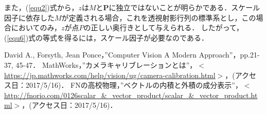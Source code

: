 \documentclass[a4paper,10pt]{jarticle}
\begin{document}
また，(\ref{equ2})式から，$ z $は$ M $と$ {\bm P} $に独立ではないことが明らかである．スケール因子に依存した$ M $が定義される場合，これを透視射影行列の標準系とし，この場合においてのみ，$ z $が点$ P $の正しい奥行きとして与えられる．
したがって，(\ref{equ6})式の等式を得るには，スケール因子が必要なのである．


\begin{thebibliography}{99}
 David A., Forsyth, Jean Ponce，”Computer Vision A Modern Approach”，pp.21-37, 45-47．
 MathWorks，”カメラキャリブレーションとは”，$<$\url{https://jp.mathworks.com/help/vision/ug/camera-calibration.html}$>$，(アクセス日：2017/5/16)．
 FNの高校物理，”ベクトルの内積と外積の成分表示”，$<$\url{http://fnorio.com/0126scalar_&_vector_product/scalar_&_vector_product.html}$>$，(アクセス日：2017/5/16)．
\end{thebibliography}
\end{document}
